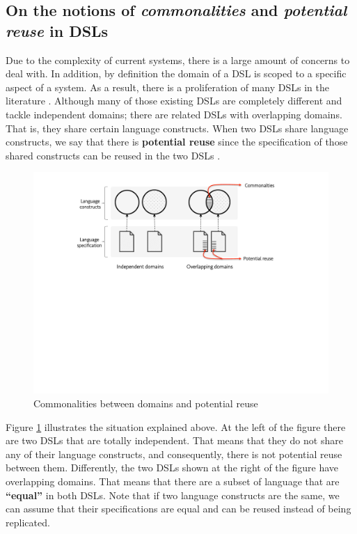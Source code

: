 \subsection{On the notions of \textit{commonalities} and \textit{potential reuse} in DSLs}

Due to the complexity of current systems, there is a large amount of concerns to deal with. In addition, by definition the domain of a DSL is scoped to a specific aspect of a system. As a result, there is a proliferation of many DSLs in the literature \cite{Mernik:2005b}. Although many of those existing DSLs are completely different and tackle independent domains; there are related DSLs with overlapping domains. That is, they share certain language constructs. When two DSLs share language constructs, we say that there is \textbf{potential reuse} since the specification of those shared constructs can be reused in the two DSLs \cite[p. 60-61]{voelter:2013}.

\begin{figure}
\centering
\includegraphics[width=1\linewidth]{images/domains-fig.pdf}
\caption{Commonalities between domains and potential reuse}
\label{fig:domains}
\end{figure}

Figure \ref{fig:domains} illustrates the situation explained above. At the left of the figure there are two DSLs that are totally independent. That means that they do not share any of their language constructs, and consequently, there is not potential reuse between them. Differently, the two DSLs shown at the right of the figure have overlapping domains. That means that there are a subset of language that are \large\textbf{``equal'' }\normalsize in both DSLs. Note that if two language constructs are the same, we can assume that their specifications are equal and can be reused instead of being replicated.


